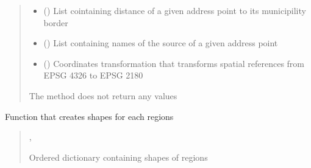 \documentclass[letterpaper,10pt,english]{sphinxmanual}
\begin{document}
\begin{fulllineitems}
\begin{quote}
\begin{description}
\begin{itemize}
\item {} 
\sphinxAtStartPar
{} (\sphinxcode{\sphinxupquote{List}}{[}\sphinxcode{\sphinxupquote{float}}{]}) \textendash{} List cointaining distance of a given address point to its municipility border

\item {} 
\sphinxAtStartPar
{} (\sphinxcode{\sphinxupquote{List}}{[}\sphinxcode{\sphinxupquote{str}}{]}) \textendash{} List containing names of the source of a given address point

\item {} 
\sphinxAtStartPar
{} () \textendash{} Coordinates transformation that transforms spatial references from EPSG 4326 to EPSG 2180

\end{itemize}

\sphinxAtStartPar
{}

\sphinxAtStartPar
The method does not return any values

\end{description}\end{quote}

\end{fulllineitems}


\begin{fulllineitems}
\label{\detokenize{geo_utilities:geo_utilities.get_region_shapes}}
\pysigstartsignatures
{}
\pysigstopsignatures
\sphinxAtStartPar
Function that creates shapes for each regions
\begin{quote}\begin{description}
\sphinxAtStartPar
\sphinxcode{\sphinxupquote{Dict}}{[}, \sphinxcode{\sphinxupquote{Geometry}}{]}

\sphinxAtStartPar
Ordered dictionary containing shapes of regions

\end{description}\end{quote}

\end{fulllineitems}
\end{document}
